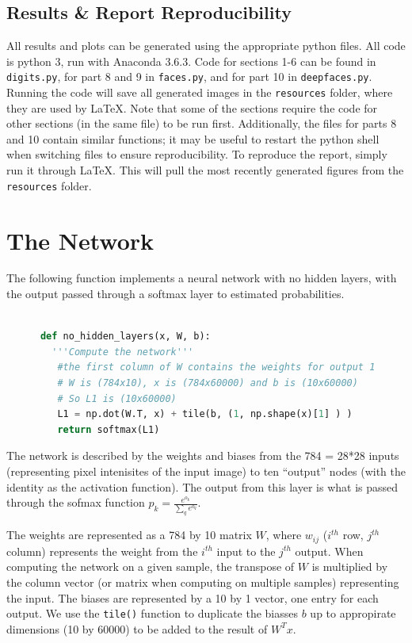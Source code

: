\documentclass{article}
\begin{document}
   \subsection{Results \& Report Reproducibility}
   All results and plots can be generated using the appropriate python files.
   All code is python 3, run with Anaconda 3.6.3.
   Code for sections 1-6 can be found in \texttt{digits.py}, for part 8 and 9 in \texttt{faces.py},
   and for part 10 in \texttt{deepfaces.py}.
   Running the code will save all generated images in the \texttt{resources} folder,
   where they are used by \LaTeX. Note that some of the sections require the code for
   other sections (in the same file) to be run first. Additionally, the files for parts 8 and 10
   contain similar functions; it may be useful to restart the python shell when switching files
   to ensure reproducibility.
   To reproduce the report, simply run it through \LaTeX. This will pull the most recently
   generated figures from the \texttt{resources} folder.


   \section{The Network}
   The following function implements a neural network with no hidden layers, with the
   output passed through a softmax layer to estimated probabilities.

   \begin{lstlisting}[language=Python]

      def no_hidden_layers(x, W, b):
   	    '''Compute the network'''
      	 #the first column of W contains the weights for output 1
       	 # W is (784x10), x is (784x60000) and b is (10x60000)
       	 # So L1 is (10x60000)
      	 L1 = np.dot(W.T, x) + tile(b, (1, np.shape(x)[1] ) )
     	 return softmax(L1)
   \end{lstlisting}

   The network is described by the weights and biases from the 784 = 28*28 inputs
   (representing pixel intenisites of the input image) to ten ``output'' nodes
   (with the identity as the activation function). The output from this layer is what is
   passed through the sofmax function $p_k = \frac{ e^{o_k} }{ \sum_q e^{o_q}}$.

   The weights are represented as a 784 by 10 matrix $W$, where $w_{ij}$ ($i^{th}$ row, $j^{th}$
   column) represents the weight from the $i^{th}$ input to the $j^{th}$ output.
   When computing the network on a given sample, the transpose of $W$ is multiplied
   by the column vector (or matrix when computing on multiple samples) representing the input.
   The biases are represented by a 10 by 1 vector, one entry for each output. We use the \texttt{tile()} function
   to duplicate the biasses $b$ up to appropirate dimensions (10 by 60000) to be added to the result of $W^T x$.
\end{document}
